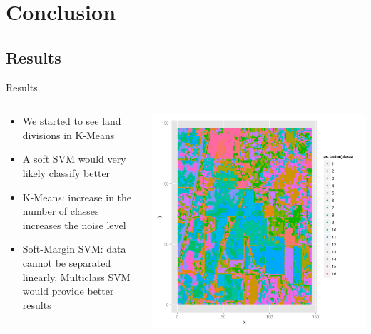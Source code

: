 \documentclass[11pt]{beamer}
\begin{document}

\section{Conclusion}
\subsection{Results}
\begin{frame}{Results}
\begin{columns}[T]
\begin{column}{.48\textwidth}
\begin{itemize}
\item We started to see land divisions in K-Means
\item A soft SVM would very likely classify better
\item K-Means: increase in the number of classes increases the noise level
\item Soft-Margin SVM: data cannot be separated linearly. Multiclass SVM would provide better results 
\end{itemize}
\end{column}
\hfill
\begin{column}{.48\textwidth}
\includegraphics[scale=.3]{km16.png}
\end{column}
\end{columns}
\end{frame}
\end{document}
